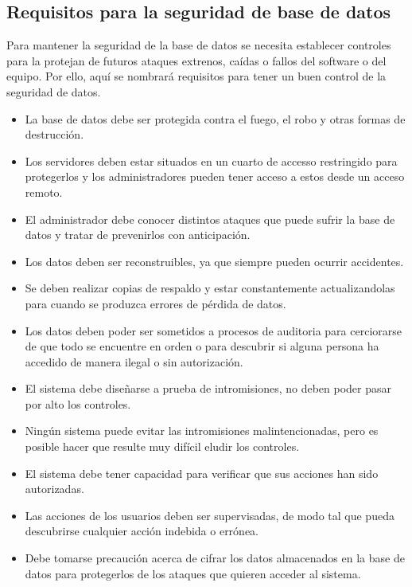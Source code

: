 \documentclass[%
 reprint,
 amsmath,amssymb,
 aps,
]{revtex4-1}
\begin{document}
\subsection{Requisitos para la seguridad de base de datos}
Para mantener la seguridad de la base de datos se necesita establecer controles para la protejan de futuros ataques extrenos, caídas o fallos del software o del equipo. Por ello, aquí se nombrará requisitos para tener un buen control de la seguridad de datos.
\begin{itemize}
\item La base de datos debe ser protegida contra el fuego, el robo y otras formas de destrucción.
\item Los servidores deben estar situados en un cuarto de accesso restringido para protegerlos y los administradores pueden tener acceso a estos desde un acceso remoto.
\item El administrador debe conocer distintos ataques que puede sufrir la base de datos y tratar de prevenirlos con anticipación.
\item Los datos deben ser reconstruibles, ya que siempre pueden ocurrir accidentes.
\item Se deben realizar copias de respaldo y estar constantemente actualizandolas para cuando se produzca errores de pérdida de datos.
\item Los datos deben poder ser sometidos a procesos de auditoria para cerciorarse de que todo se encuentre en orden o para descubrir si alguna persona ha accedido de manera ilegal o sin autorización.
\item El sistema debe diseñarse a prueba de intromisiones, no deben poder pasar por alto los controles.
\item Ningún sistema puede evitar las intromisiones malintencionadas, pero es posible hacer que resulte muy difícil eludir los controles.
\item El sistema debe tener capacidad para verificar que sus acciones han sido autorizadas.
\item Las acciones de los usuarios deben ser supervisadas, de modo tal que pueda descubrirse cualquier acción indebida o errónea.
\item Debe tomarse precaución acerca de cifrar los datos almacenados en la base de datos para protegerlos de los ataques que quieren acceder al sistema.  \cite{book1}
\end{itemize}
\end{document}
